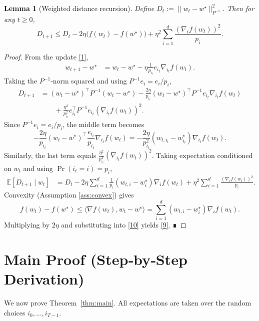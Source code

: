 \documentclass{article}
\newtheorem{lemma}{Lemma}
\newcommand{\E}{\mathbb{E}}
\begin{document}
\begin{lemma}[Weighted distance recursion]\label{lem:dist}
Define $D_t:=\|w_t-w^\star\|_{P^{-1}}^{2}$. Then for any $t\ge0$,
\[
\boxed{
D_{t+1}\le D_t-2\eta\bigl(f(w_t)-f(w^\star)\bigr)+\eta^{2}
\sum_{i=1}^{d}\frac{(\nabla_i f(w_t))^{2}}{p_i}.
}
\tag{9}
\]
\end{lemma}
\begin{proof}
From the update \eqref{1},
\[
\begin{aligned}
w_{t+1}-w^\star
&=w_t-w^\star-\eta\frac{1}{p_{i_t}}e_{i_t}\nabla_{i_t}f(w_t).
\end{aligned}
\]
Taking the $P^{-1}$‑norm squared and using $P^{-1}e_i=e_i/p_i$,
\[
\begin{aligned}
D_{t+1}
&=(w_t-w^\star)^{\!\top}P^{-1}(w_t-w^\star)
   -\frac{2\eta}{p_{i_t}}(w_t-w^\star)^{\!\top}P^{-1}e_{i_t}\nabla_{i_t}f(w_t)\\
&\qquad+\frac{\eta^{2}}{p_{i_t}^{2}}e_{i_t}^{\!\top}P^{-1}e_{i_t}
      (\nabla_{i_t}f(w_t))^{2}.
\end{aligned}
\]
Since $P^{-1}e_{i}=e_i/p_i$, the middle term becomes
\[
-\frac{2\eta}{p_{i_t}}(w_t-w^\star)^{\!\top}\frac{e_{i_t}}{p_{i_t}}\nabla_{i_t}f(w_t)
=-\frac{2\eta}{p_{i_t}^{2}}(w_{t,i_t}-w^\star_{i_t})\nabla_{i_t}f(w_t).
\]
Similarly, the last term equals $\frac{\eta^{2}}{p_{i_t}^{3}}(\nabla_{i_t}f(w_t))^{2}$.
Taking expectation conditioned on $w_t$ and using $\Pr(i_t=i)=p_i$,
\[
\begin{aligned}
\E[D_{t+1}\mid w_t]
&=D_t-2\eta\sum_{i=1}^{d}\frac{1}{p_i}(w_{t,i}-w^\star_i)\nabla_i f(w_t)
   +\eta^{2}\sum_{i=1}^{d}\frac{(\nabla_i f(w_t))^{2}}{p_i}.
\end{aligned}
\tag{10}
\]
Convexity (Assumption \ref{ass:convex}) gives
\[
f(w_t)-f(w^\star)\le\langle\nabla f(w_t),w_t-w^\star\rangle
   =\sum_{i=1}^{d}(w_{t,i}-w^\star_i)\nabla_i f(w_t).
\]
Multiplying by $2\eta$ and substituting into \eqref{10} yields \eqref{9}. ∎
\end{proof}

\section*{Main Proof (Step‑by‑Step Derivation)}

We now prove Theorem~\ref{thm:main}. All expectations are taken over the
random choices $i_0,\dots,i_{T-1}$.
\end{document}
